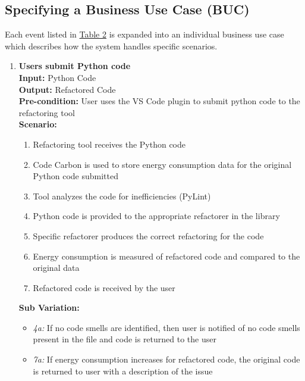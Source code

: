 \documentclass[12pt]{article}
\begin{document}
\subsection{Specifying a Business Use Case (BUC)}
Each event listed in \hyperref[tab:work-part]{Table 2} is expanded
into an individual business use case which describes how the system
handles specific scenarios.

\begin{enumerate}[label={\bf BUC \arabic*:}, wide=0pt, font=\itshape]
  \item {\bf Users submit Python code} \\[2mm]
    \textbf{Input:} Python Code \\
    \textbf{Output:} Refactored Code \\
    \textbf{Pre-condition:} User uses the VS Code plugin to submit python code to the 
    refactoring tool \\[2mm]
    \textbf{Scenario:}
    \begin{enumerate}[label=\arabic*.]
      \item Refactoring tool receives the Python code
      \item Code Carbon is used to store energy consumption data for the
        original Python code submitted
      \item Tool analyzes the code for inefficiencies (PyLint)
      \item Python code is provided to the appropriate refactorer in the library
      \item Specific refactorer produces the correct refactoring for the code
      \item Energy consumption is measured of refactored code and
        compared to the original data
      \item Refactored code is received by the user
    \end{enumerate}
    \textbf{Sub Variation: }
    \begin{itemize}
      \item \textit{4a:} If no code smells are identified, then user is notified of no code 
      smells present in the file and code is returned to the user
      \item \textit{7a:} If energy consumption increases for refactored code, the original 
      code is returned to user with a description of the issue
    \end{itemize}


\end{enumerate}
\end{document}

